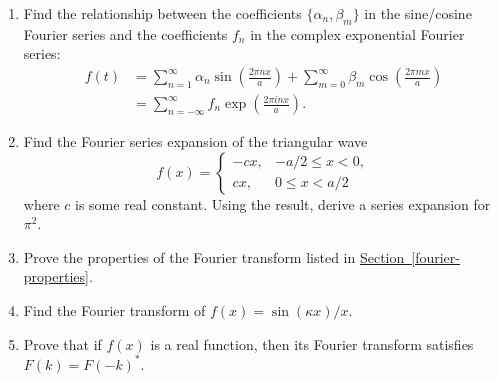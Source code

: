 \documentclass[10pt,a4paper]{article}
\begin{document}
\begin{enumerate}
\item 
Find the relationship between the coefficients $\{\alpha_n, \beta_m\}$
in the sine/cosine Fourier series and the coefficients $f_n$ in the
complex exponential Fourier
series:
\begin{align}
  f(t) &= \sum_{n=1}^\infty \alpha_n \sin\left(\frac{2\pi n x}{a}\right)
  + \sum_{m=0}^\infty \beta_m \cos\left(\frac{2 \pi m x}{a}\right) \\
  &= \sum_{n=-\infty}^\infty f_n \exp\left(\frac{2\pi i n x}{a}\right).
\end{align}

\item
Find the Fourier series expansion of the triangular
wave
\begin{equation}
f(x) = \left\{\begin{array}{rr}-c x, &-a/2 \le x < 0, \\ c x, & 0 \le x < a/2\end{array}\right.
\end{equation}
where $c$ is some real constant. Using the result, derive a series
expansion for $\pi^2$.

\item
Prove the properties of the Fourier transform listed in
\hyperref[fourier-properties]{Section~\ref{fourier-properties}}.

\item
Find the Fourier transform of $f(x) = \sin(\kappa x)/x.$

\item
Prove that if $f(x)$ is a real function, then its Fourier transform
satisfies $F(k) = F(-k)^*$.
\end{enumerate}
\end{document}
